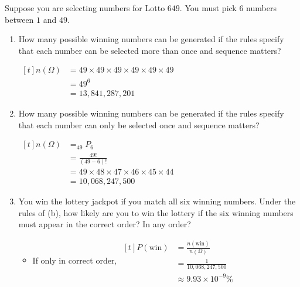 \begin{example}
    Suppose you are selecting numbers for Lotto $649$. You must pick $6$ numbers between $1$ and $49$.

    \begin{enumerate}[label=\alph*)]
        \item How many possible winning numbers can be generated if the rules specify that each number can be selected more than once and sequence matters? 
        
        $\begin{aligned}[t]
            n(\Omega) & = 49 \times 49 \times 49 \times 49 \times 49 \times 49 \\
                      & = 49^6                                                 \\
                      & = 13,841,287,201
        \end{aligned}$

        \item How many possible winning numbers can be generated if the rules specify that each number can only be selected once and sequence matters?
        
        $\begin{aligned}[t]
            n(\Omega) & = _{49}P_6                                             \\
                      & = \frac{49!}{(49-6)!}                                  \\
                      & = 49 \times 48 \times 47 \times 46 \times 45 \times 44 \\
                      & = 10,068,247,500
        \end{aligned}$

        \item You win the lottery jackpot if you match all six winning numbers. Under the rules of (b), how likely are you to win the lottery if the six winning numbers must appear in the correct order? In any order?
        
        \begin{itemize}
            \item If only in correct order, $\begin{aligned}[t]
                P(\text{win}) & = \frac{n(\text{win})}{n(\Omega)} \\
                              & = \frac{1}{10,068,247,500}        \\
                              & \approx 9.93 \times 10^{-9} \%
            \end{aligned}$


\end{itemize}
\end{enumerate}
\end{example}

